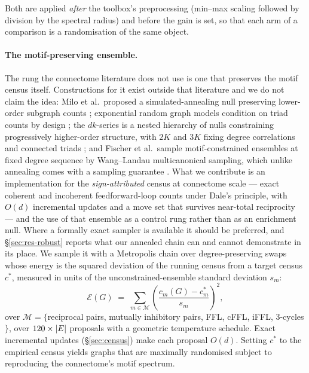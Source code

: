 Both are applied \emph{after} the toolbox's preprocessing (min--max scaling followed by
division by the spectral radius) and before the gain is set, so that each arm of a
comparison is a randomisation of the same object.

\paragraph{The motif-preserving ensemble.}
The rung the connectome literature does not use is one that preserves the motif census
itself. Constructions for it exist outside that literature and we do not claim the idea:
Milo et al.\ proposed a simulated-annealing null preserving lower-order subgraph counts
\cite{milo2002network,milo2004superfamilies}; exponential random graph models condition
on triad counts by design \cite{frank1986markov,robins2007introduction}; the $dk$-series
is a nested hierarchy of nulls constraining progressively higher-order structure, with
$2K$ and $3K$ fixing degree correlations and connected triads
\cite{mahadevan2006systematic,orsini2015quantifying}; and Fischer et al.\ sample
motif-constrained ensembles at fixed degree sequence by Wang--Landau multicanonical
sampling, which unlike annealing comes with a sampling guarantee
\cite{fischer2015sampling}. What we contribute is an implementation for the
\emph{sign-attributed} census at connectome scale --- exact coherent and incoherent
feedforward-loop counts under Dale's principle, with $O(d)$ incremental updates and a
move set that survives near-total reciprocity --- and the use of that ensemble as a
control rung rather than as an enrichment null. Where a formally exact sampler is
available it should be preferred, and \S\ref{sec:res-robust} reports what our annealed
chain can and cannot demonstrate in its place. We sample it with a Metropolis chain over degree-preserving swaps whose
energy is the squared deviation of the running census from a target census $c^{*}$,
measured in units of the unconstrained-ensemble standard deviation $s_m$:
\begin{equation}
\mathcal{E}(G) \;=\; \sum_{m \in \mathcal{M}} \left( \frac{c_m(G) - c^{*}_m}{s_m} \right)^{2},
\label{eq:anneal}
\end{equation}
over $\mathcal{M} = \{$reciprocal pairs, mutually inhibitory pairs, FFL, cFFL, iFFL,
3-cycles$\}$, over $120 \times |E|$ proposals with a geometric temperature
schedule. Exact incremental updates (\S\ref{sec:census}) make each proposal $O(d)$.
Setting $c^{*}$ to the empirical census yields graphs that are maximally randomised
subject to reproducing the connectome's motif spectrum.

